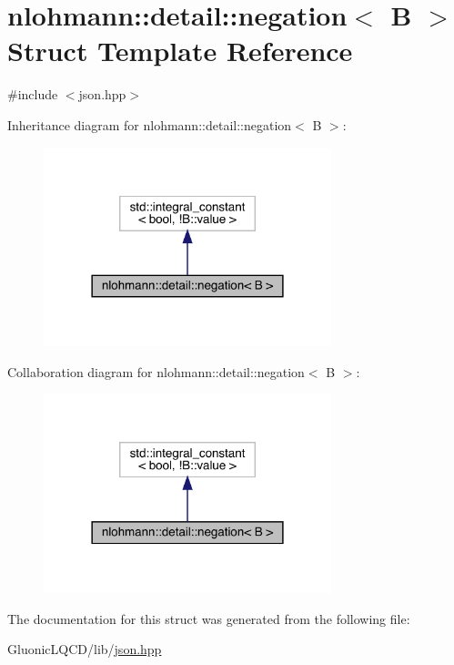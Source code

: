 \hypertarget{structnlohmann_1_1detail_1_1negation}{}\section{nlohmann\+::detail\+::negation$<$ B $>$ Struct Template Reference}
\label{structnlohmann_1_1detail_1_1negation}


{\ttfamily \#include $<$json.\+hpp$>$}



Inheritance diagram for nlohmann\+::detail\+::negation$<$ B $>$\+:\nopagebreak
\begin{figure}[H]
\begin{center}
\leavevmode
\includegraphics[width=237pt]{structnlohmann_1_1detail_1_1negation__inherit__graph}
\end{center}
\end{figure}


Collaboration diagram for nlohmann\+::detail\+::negation$<$ B $>$\+:\nopagebreak
\begin{figure}[H]
\begin{center}
\leavevmode
\includegraphics[width=237pt]{structnlohmann_1_1detail_1_1negation__coll__graph}
\end{center}
\end{figure}


The documentation for this struct was generated from the following file\+:\begin{DoxyCompactItemize}
\item 
Gluonic\+L\+Q\+C\+D/lib/\mbox{\hyperlink{json_8hpp}{json.\+hpp}}\end{DoxyCompactItemize}
